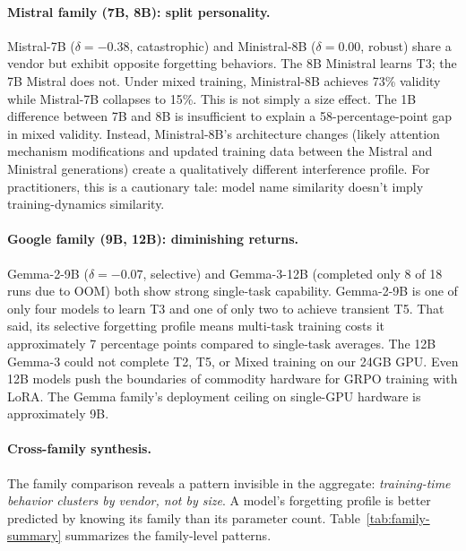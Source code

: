 \documentclass[11pt]{article}
\begin{document}
\paragraph{Mistral family (7B, 8B): split personality.}
Mistral-7B ($\delta = -0.38$, catastrophic) and Ministral-8B ($\delta = 0.00$, robust) share a vendor but exhibit opposite forgetting behaviors.  The 8B Ministral learns T3; the 7B Mistral does not.  Under mixed training, Ministral-8B achieves 73\% validity while Mistral-7B collapses to 15\%.  This is not simply a size effect.  The 1B difference between 7B and 8B is insufficient to explain a 58-percentage-point gap in mixed validity.  Instead, Ministral-8B's architecture changes (likely attention mechanism modifications and updated training data between the Mistral and Ministral generations) create a qualitatively different interference profile.  For practitioners, this is a cautionary tale: model name similarity doesn't imply training-dynamics similarity.

\paragraph{Google family (9B, 12B): diminishing returns.}
Gemma-2-9B ($\delta = -0.07$, selective) and Gemma-3-12B (completed only 8 of 18 runs due to OOM) both show strong single-task capability.  Gemma-2-9B is one of only four models to learn T3 and one of only two to achieve transient T5.  That said, its selective forgetting profile means multi-task training costs it approximately 7 percentage points compared to single-task averages.  The 12B Gemma-3 could not complete T2, T5, or Mixed training on our 24GB GPU.  Even 12B models push the boundaries of commodity hardware for GRPO training with LoRA.  The Gemma family's deployment ceiling on single-GPU hardware is approximately 9B.

\paragraph{Cross-family synthesis.}
The family comparison reveals a pattern invisible in the aggregate: \emph{training-time behavior clusters by vendor, not by size}.  A model's forgetting profile is better predicted by knowing its family than its parameter count.  Table~\ref{tab:family-summary} summarizes the family-level patterns.
\end{document}
